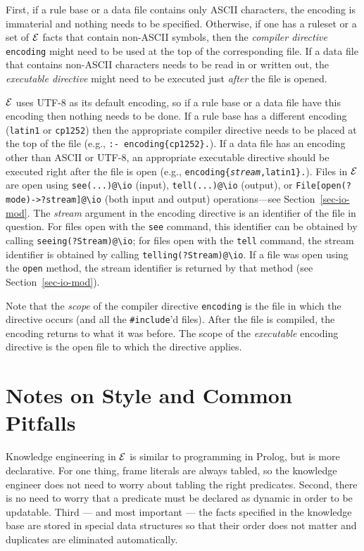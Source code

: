 \documentclass[11pt]{article}
\newcommand{\ERGO}{\mbox{\ensuremath{\cal{E}}\smaller{{\sc{RGO}}}}\xspace}
\newcommand{\FLSYSTEM}{\ERGO}
\newcommand{\bs}{\textbackslash}
\begin{document}
First, if a rule base or a data file contains only ASCII characters,
the encoding is immaterial and nothing needs to be specified.  Otherwise,
if one has a ruleset or a set of \FLSYSTEM facts that contain non-ASCII
symbols, then the \emph{compiler directive} \texttt{encoding} might need to be
used at the top of the corresponding file.  If a data file that contains
non-ASCII characters needs to be read in or written out, the
\emph{executable directive} might need to
be executed just \emph{after}   the file is opened.

\FLSYSTEM uses UTF-8 as its default encoding, so if a rule base or a data
file have this encoding then nothing needs to be done. If a rule base has a
different encoding (\texttt{latin1} or \texttt{cp1252})
then the appropriate compiler directive needs to be placed at the top of
the file (e.g., \texttt{:- encoding\{cp1252\}.}).
If a data file has an encoding other than ASCII or UTF-8, an appropriate
executable directive should be executed right after the file is open (e.g., 
\texttt{encoding\{\textnormal{\textit{stream}},latin1\}.}).
Files in \FLSYSTEM are open using
\texttt{see(...)@\bs{}io} (input), \texttt{tell(...)@\bs{}io} (output), or
\texttt{File[open(?mode)->?stream]@\bs{}io} (both input and output)
operations---see Section~\ref{sec-io-mod}.
The \emph{stream} argument in the encoding directive is an identifier of
the file in question. For files open with the \texttt{see} command,
this identifier
can be obtained by calling \texttt{seeing(?Stream)@\bs{}io};
for files open with the
\texttt{tell} command, the stream identifier is obtained by
calling \texttt{telling(?Stream)@\bs{}io}. If a file was open using the
\texttt{open} method, the stream identifier is returned by that method
(see Section~\ref{sec-io-mod}). 

Note that the \emph{scope} of the compiler directive \texttt{encoding} is
the file in which the directive occurs (and all the \verb|#include|'d files). After the file is compiled,
the encoding returns to what it was before.
The scope of the \emph{executable} encoding directive 
is the open file to which the directive applies.


\section{Notes on Style and Common Pitfalls}

Knowledge engineering
in \FLSYSTEM is similar to programming in Prolog, but is more
declarative. For one thing, frame literals are always tabled, so the
knowledge engineer does not need to worry about tabling the right predicates.
Second, there is no need to worry that a predicate must be declared as
dynamic in order to be updatable. Third --- and most important --- the facts 
specified in the knowledge base are stored in special data structures so
that their order does not matter and duplicates are eliminated automatically. 
\end{document}
